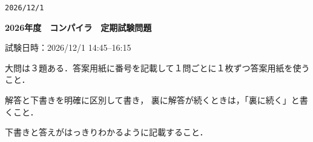 \documentclass[dvipdfmx]{jarticle}
\begin{document}
\begin{flushright}
    \verb|2026/12/1|
\end{flushright}
\begin{center}
    {\bf\Large
        2026年度　コンパイラ　定期試験問題
    }
\end{center}

\begin{trivlist}
    \item[$\bullet$] 試験日時：2026/12/1 14:45--16:15
    \item[$\bullet$] 大問は３題ある．答案用紙に番号を記載して１問ごとに１枚ずつ答案用紙を使うこと．
    \item[$\bullet$] 解答と下書きを明確に区別して書き，
    裏に解答が続くときは，「裏に続く」と書くこと．
    \item[$\bullet$] 下書きと答えがはっきりわかるように記載すること．
\end{trivlist}
\end{document}
